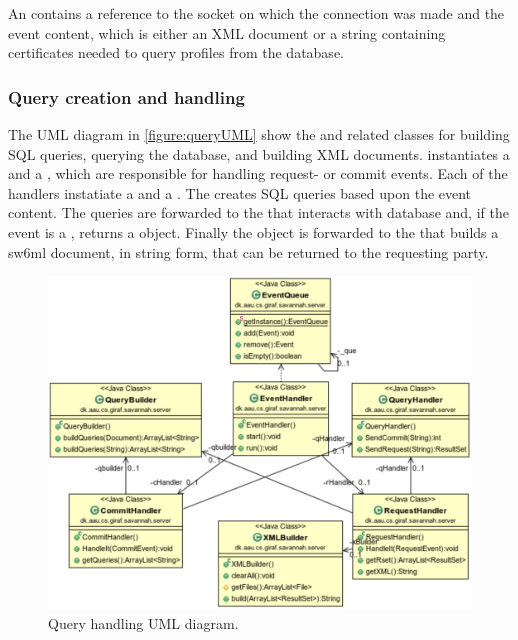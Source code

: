 An  contains a reference to the socket on which the connection was made and the event content, which is either an XML document or a string containing certificates
needed to query profiles from the database.
\subsubsection{Query creation and handling}

The UML diagram in \autoref{figure:queryUML} show the  and related classes for building SQL queries, querying the database, and building XML documents.
 instantiates a  and a , which are responsible for handling request- or commit events.
Each of the handlers instatiate a  and a . The  creates SQL queries based upon the event content. The queries are forwarded to the 
that interacts with database and, if the event is a , returns a  object. Finally the  object is forwarded to the  that builds a sw6ml document,
in string form, that can be returned to the requesting party. 
\begin{figure}[H]
 \centering
  \includegraphics[scale=0.65]{images/queryhandling}
  \caption{Query handling UML diagram.}
  \label{figure:queryUML}
\end{figure}

